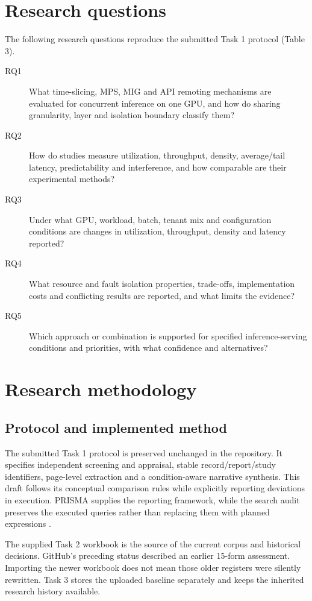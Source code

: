 \section{Research questions}
The following research questions reproduce the submitted Task 1 protocol (Table 3).
\begin{description}
\item[RQ1] What time-slicing, MPS, MIG and API remoting mechanisms are evaluated for concurrent inference on one GPU, and how do sharing granularity, layer and isolation boundary classify them?
\item[RQ2] How do studies measure utilization, throughput, density, average/tail latency, predictability and interference, and how comparable are their experimental methods?
\item[RQ3] Under what GPU, workload, batch, tenant mix and configuration conditions are changes in utilization, throughput, density and latency reported?
\item[RQ4] What resource and fault isolation properties, trade-offs, implementation costs and conflicting results are reported, and what limits the evidence?
\item[RQ5] Which approach or combination is supported for specified inference-serving conditions and priorities, with what confidence and alternatives?
\end{description}

\section{Research methodology}
\subsection{Protocol and implemented method}
The submitted Task 1 protocol is preserved unchanged in the repository. It specifies independent screening and appraisal, stable record/report/study identifiers, page-level extraction and a condition-aware narrative synthesis. This draft follows its conceptual comparison rules while explicitly reporting deviations in execution. PRISMA supplies the reporting framework, while the search audit preserves the executed queries rather than replacing them with planned expressions \cite{prisma,prismas,kitchenham}.

The supplied Task 2 workbook is the source of the current corpus and historical decisions. GitHub's preceding status described an earlier 15-form assessment. Importing the newer workbook does not mean those older registers were silently rewritten. Task 3 stores the uploaded baseline separately and keeps the inherited research history available.

